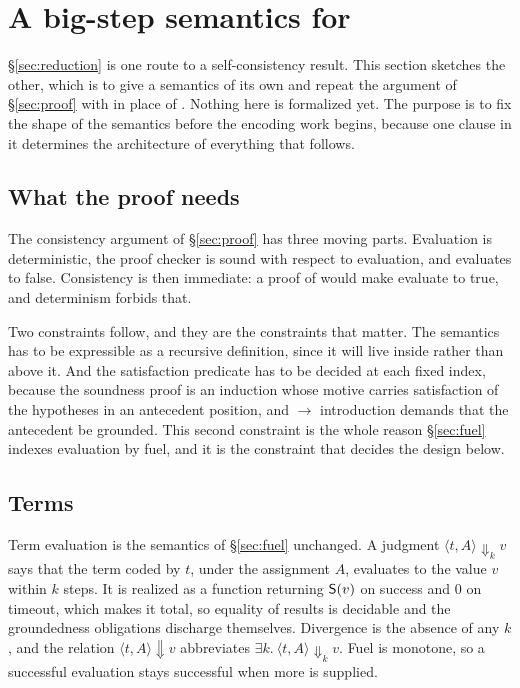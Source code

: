 \section{A big-step semantics for \QGA}
\label{sec:semantics}

\providecommand{\tv}[1]{\ensuremath{\mathsf{#1}}}
\providecommand{\bs}[1]{\ensuremath{\Downarrow_{#1}}}

\S\ref{sec:reduction} is one route to a self-consistency result.  This section
sketches the other, which is to give \QGA{} a semantics of its own and repeat the
argument of \S\ref{sec:proof} with \QGA{} in place of \BGA.  Nothing here is
formalized yet.  The purpose is to fix the shape of the semantics before the
encoding work begins, because one clause in it determines the architecture of
everything that follows.

\subsection{What the proof needs}

The consistency argument of \S\ref{sec:proof} has three moving parts.
Evaluation is deterministic, the proof checker is sound with respect to
evaluation, and  evaluates to false.  Consistency is then immediate:
a proof of  would make  evaluate to true, and determinism
forbids that.

Two constraints follow, and they are the constraints that matter.  The semantics
has to be expressible as a \QGA{} recursive definition, since it will live inside
\QGA{} rather than above it.  And the satisfaction predicate has to be decided at
each fixed index, because the soundness proof is an induction whose motive
carries satisfaction of the hypotheses in an antecedent position, and $\longrightarrow$
introduction demands that the antecedent be grounded.  This second constraint is
the whole reason \S\ref{sec:fuel} indexes evaluation by fuel, and it is the
constraint that decides the design below.

\subsection{Terms}

Term evaluation is the semantics of \S\ref{sec:fuel} unchanged.  A judgment
$\langle t, A\rangle \bs{k} v$ says that the term coded by $t$, under the
assignment $A$, evaluates to the value $v$ within $k$ steps.  It is realized as
a \QGA{} function  returning $\mathsf{S}(v)$ on success and $0$ on
timeout, which makes it total, so equality of results is decidable and the
groundedness obligations discharge themselves.  Divergence is the absence of any
$k$, and the relation $\langle t, A\rangle \Downarrow v$ abbreviates
$\exists k.\ \langle t, A\rangle \bs{k} v$.  Fuel is monotone, so a successful
evaluation stays successful when more is supplied.

